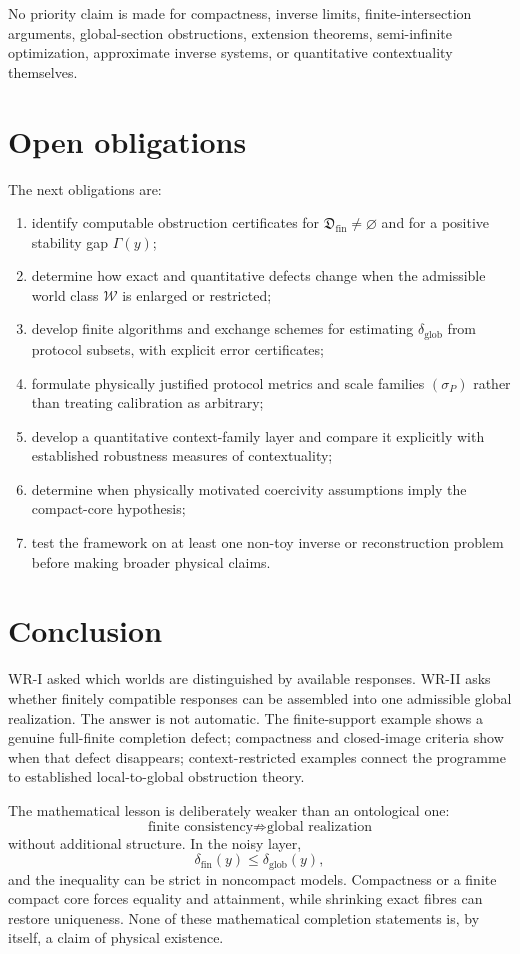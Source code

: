 \documentclass[11pt]{article}
\newcommand{\W}{\mathcal W}
\newcommand{\Dfin}{\mathfrak D_{\mathrm{fin}}}
\begin{document}
No priority claim is made for compactness, inverse limits, finite-intersection
arguments, global-section obstructions, extension theorems, semi-infinite
optimization, approximate inverse systems, or quantitative contextuality
themselves.

\section{Open obligations}

The next obligations are:
\begin{enumerate}
\item identify computable obstruction certificates for
$\Dfin\neq\varnothing$ and for a positive stability gap $\Gamma(y)$;
\item determine how exact and quantitative defects change when the admissible
world class $\W$ is enlarged or restricted;
\item develop finite algorithms and exchange schemes for estimating
$\delta_{\mathrm{glob}}$ from protocol subsets, with explicit error
certificates;
\item formulate physically justified protocol metrics and scale families
$(\sigma_P)$ rather than treating calibration as arbitrary;
\item develop a quantitative context-family layer and compare it explicitly
with established robustness measures of contextuality;
\item determine when physically motivated coercivity assumptions imply the
compact-core hypothesis;
\item test the framework on at least one non-toy inverse or reconstruction
problem before making broader physical claims.
\end{enumerate}

\section*{Conclusion}

WR-I asked which worlds are distinguished by available responses. WR-II asks
whether finitely compatible responses can be assembled into one admissible
global realization. The answer is not automatic. The finite-support example
shows a genuine full-finite completion defect; compactness and closed-image
criteria show when that defect disappears; context-restricted examples connect
the programme to established local-to-global obstruction theory.

The mathematical lesson is deliberately weaker than an ontological one:
\[
\text{finite consistency}
\not\Rightarrow
\text{global realization}
\]
without additional structure. In the noisy layer,
\[
\delta_{\mathrm{fin}}(y)
\le
\delta_{\mathrm{glob}}(y),
\]
and the inequality can be strict in noncompact models. Compactness or a finite
compact core forces equality and attainment, while shrinking exact fibres can
restore uniqueness. None of these mathematical completion statements is, by
itself, a claim of physical existence.
\end{document}
